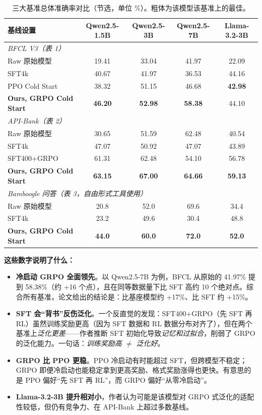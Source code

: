 \documentclass[11pt,UTF8,fontset=fandol]{ctexart}
\begin{document}
\begin{table}[H]\centering\caption{三大基准总体准确率对比（节选，单位 \%）。粗体为该模型该基准上的最佳。}
\small
\begin{tabular}{lcccc}
\toprule
基线设置 & Qwen2.5-1.5B & Qwen2.5-3B & Qwen2.5-7B & Llama-3.2-3B \\ \midrule
\multicolumn{5}{l}{\textit{BFCL V3（表 1）}}\\
Raw 原始模型        & 19.41 & 33.04 & 41.97 & 22.09 \\
SFT4k              & 40.67 & 41.97 & 36.53 & 44.16 \\
PPO Cold Start     & 38.32 & 51.15 & 46.68 & \textbf{42.98} \\
\textbf{Ours, GRPO Cold Start} & \textbf{46.20} & \textbf{52.98} & \textbf{58.38} & 44.10 \\ \midrule
\multicolumn{5}{l}{\textit{API-Bank（表 2）}}\\
Raw 原始模型        & 30.65 & 51.59 & 62.48 & 40.54 \\
SFT4k              & 47.07 & 50.92 & 47.07 & 43.89 \\
SFT400+GRPO        & 61.31 & 62.48 & 54.10 & 56.78 \\
\textbf{Ours, GRPO Cold Start} & \textbf{63.15} & \textbf{67.00} & \textbf{64.66} & \textbf{59.13} \\ \midrule
\multicolumn{5}{l}{\textit{Bamboogle 问答（表 3，自由形式工具使用）}}\\
Raw 原始模型        & 20.8 & 52.0 & 69.6 & 34.4 \\
SFT4k              & 23.2 & 49.6 & 30.4 & 48.8 \\
\textbf{Ours, GRPO Cold Start} & \textbf{44.0} & \textbf{60.0} & \textbf{72.0} & \textbf{52.0} \\ \bottomrule
\end{tabular}
\end{table}

\noindent\textbf{这些数字说明了什么：}
\begin{itemize}[leftmargin=1.5em]
\item \textbf{冷启动 GRPO 全面领先}。以 Qwen2.5-7B 为例，BFCL 从原始的 41.97\% 提到 58.38\%（约 +16 个点），且在同等数据量下比 SFT 高约 10 个绝对点。综合所有基准，论文给出的结论是：比基座模型约 +17\%、比 SFT 约 +15\%。
\item \textbf{SFT 会“背书”反伤泛化}。一个反直觉的发现：SFT400+GRPO（先 SFT 再 RL）虽然训练奖励更高（因为 SFT 数据和 RL 数据分布对齐了），但在两个基准上\emph{泛化更差}——作者推断 SFT 初始化导致\emph{记忆和过拟合}，削弱了 GRPO 的泛化能力。一句话：\emph{训练奖励高 $\neq$ 泛化好}。
\item \textbf{GRPO 比 PPO 更稳}。PPO 冷启动有时能超过 SFT，但跨模型不稳定；GRPO 即便冷启动也能稳定拿到更高奖励、格式奖励涨得也更快。有意思的是 PPO 偏好“先 SFT 再 RL”，而 GRPO 偏好“从零冷启动”。
\item \textbf{Llama-3.2-3B 提升相对小}，作者认为可能是该模型对 GRPO 式泛化的适配性较低，但仍有竞争力、在 API-Bank 上超过多数基线。
\end{itemize}
\end{document}
